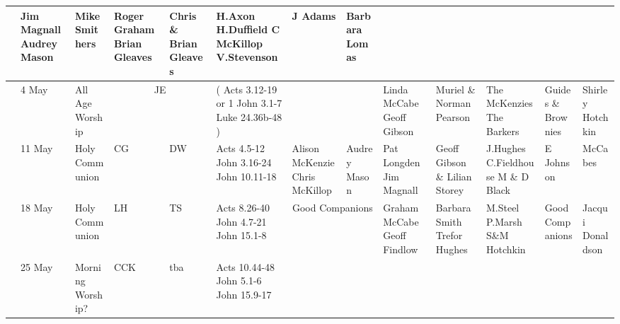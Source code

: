 \documentclass[10pt,a4paper]{article}
\begin{document}
\begin{center}
{\begin{tabular}{|l|p{1.6cm}|p{1.4cm}|p{1.0cm}|p{0.8cm}|p{3.0cm}|p{2cm}|p{1.5cm}|p{2cm}|p{2cm}|p{1.9cm}
|p{2cm}|p{1.6cm}|}
& Jim Magnall 
 Audrey Mason & Mike Smithers
  & Roger Graham Brian Gleaves & 
Chris \& Brian Gleaves  &
 H.Axon  \linebreak H.Duffield   C McKillop    V.Stevenson
 & J Adams & Barbara \linebreak Lomas \\
\hline
& 4 May & All Age Worship & \multicolumn{2}{|c|}{ JE }  &  
{\footnotesize (
Acts 3.12-19  or
1 John 3.1-7
Luke 24.36b-48
)}  &    & 
 & Linda McCabe Geoff Gibson & 
Muriel \& Norman Pearson &
The Mc\-Kenzies The Barkers
&  Guides \& Brownies & Shirley Hotchkin \\
\hline
& 11 May & Holy Communion
& CG & DW &    
Acts 4.5-12 \linebreak
1 John 3.16-24 \linebreak
John 10.11-18
& Alison McKenzie Chris McKillop  & 
Audrey Mason & Pat Longden  Jim Magnall & 
Geoff  Gibson \& Lilian Storey &
J.Hughes \linebreak C.Fieldhouse \linebreak M \& D Black
&  E Johnson & McCabes\\
\hline
& 18 May & Holy Communion
& LH & TS & 
Acts 8.26-40 \linebreak
1 John 4.7-21 \linebreak
John 15.1-8

    & \multicolumn{2}{|c|}{ Good Companions}  
 &  Graham McCabe \linebreak Geoff Findlow & 
Barbara Smith Trefor Hughes&
M.Steel P.Marsh \linebreak S\&M Hotchkin
&  Good Companions &  Jacqui Donaldson \\
\hline
& 25 May & Morning Worship?  
 &  CCK & tba & 

Acts 10.44-48 \linebreak
1 John 5.1-6 \linebreak
John 15.9-17 \linebreak


\end{tabular}}
\end{center}
\end{document}
